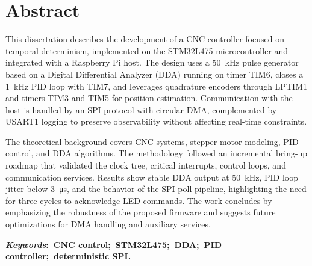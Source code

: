 \chapter*{Abstract}
\noindent This dissertation describes the development of a CNC controller
focused on temporal determinism, implemented on the STM32L475
microcontroller and integrated with a Raspberry Pi host. The design uses
a \SI{50}{\kilo\hertz} pulse generator based on a Digital Differential
Analyzer (DDA) running on timer TIM6, closes a \SI{1}{\kilo\hertz} PID
loop with TIM7, and leverages quadrature encoders through LPTIM1 and
timers TIM3 and TIM5 for position estimation. Communication with the host is
handled by an SPI protocol with circular DMA, complemented by USART1
logging to preserve observability without affecting real-time
constraints.

The theoretical background covers CNC systems, stepper motor modeling,
PID control, and DDA algorithms. The methodology followed an incremental
bring-up roadmap that validated the clock tree, critical interrupts,
control loops, and communication services. Results show stable DDA output
at \SI{50}{\kilo\hertz}, PID loop jitter below \SI{3}{\micro\second}, and
the behavior of the SPI poll pipeline, highlighting the need for three
cycles to acknowledge LED commands. The work concludes by emphasizing the
robustness of the proposed firmware and suggests future optimizations for
DMA handling and auxiliary services.

\vspace{5mm}

\noindent\textbf{\textit{Keywords}:~CNC control;~STM32L475;~DDA;~PID controller;~deterministic SPI.}
